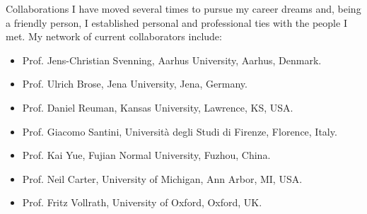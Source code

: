 \documentclass{resume} %
\begin{document}
\begin{rSection}{Collaborations}
I have moved several times to pursue my career dreams and, being a friendly person, I established personal and professional ties with the people I met. My network of current collaborators include:
\begin{itemize}
    \setlength\itemsep{-0.5em}
    \item Prof. Jens-Christian Svenning, Aarhus University, Aarhus, Denmark.
    \item Prof. Ulrich Brose, Jena University, Jena, Germany.
    \item Prof. Daniel Reuman, Kansas University, Lawrence, KS, USA.
    \item Prof. Giacomo Santini, Universit\`{a} degli Studi di Firenze, Florence, Italy.
    \item Prof. Kai Yue, Fujian Normal University, Fuzhou, China.
    \item Prof. Neil Carter, University of Michigan, Ann Arbor, MI, USA.
    \item Prof. Fritz Vollrath, University of Oxford, Oxford, UK.
\end{itemize}
\end{rSection}
\end{document}
